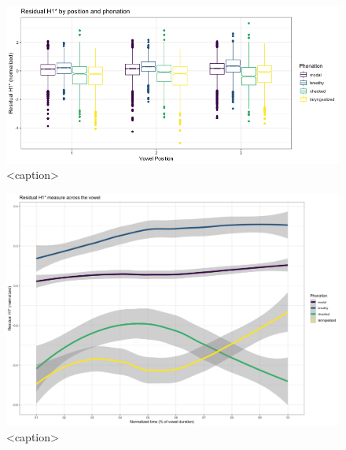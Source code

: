 \documentclass[12pt, letterpaper]{article}
\begin{document}
\begin{figure}[htbp]
  \centering
  \includegraphics[width = \linewidth]{Images/residh1_boxplot.png}
  \caption{<caption>}
  \label{fig:ResidH1_box}
\end{figure}

\begin{figure}[htbp]
  \centering
  \includegraphics[width = \linewidth]{Images/residH1_line.png}
  \caption{<caption>}
  \label{fig:ResidH1_line}
\end{figure}
\end{document}
